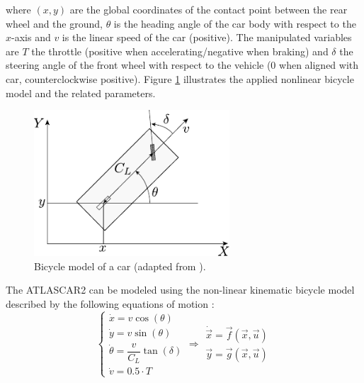 where $(x,y)$ are the global coordinates of the contact point between the rear wheel and the ground, $\theta$ is the heading angle of the car body with respect to the $x$-axis and $v$ is the linear speed of the car (positive). The manipulated variables are $T$ the throttle (positive when accelerating/negative when braking) and $\delta$ the steering angle of the front wheel with respect to the vehicle ($0$ when aligned with car, counterclockwise positive). Figure \ref{fig:car_model} illustrates the applied nonlinear bicycle model and the related parameters.
\begin{figure}[!h]
	\centering
	\includegraphics[width=0.65\textwidth]{./figure/car_model.pdf}
	\caption{Bicycle model of a car (adapted from \cite{siciliano}).}
	\label{fig:car_model}
\end{figure}

The ATLASCAR2 can be modeled using the non-linear kinematic bicycle model described by the following equations of motion \cite{safety} \cite{swarms}:
\begin{equation}
\label{eqn:dynamics_model_obstacle_avoidance}
\left \{ \begin{array}{llll}
\dot{x} = v\cos(\theta)\\
\dot{y} = v\sin(\theta)\\
\dot{\theta} =\dfrac{v}{C_L}\tan(\delta)\\
\dot{v} =0.5 \cdot T
\end{array} 
\right .
\Longrightarrow 
\begin{array}{llll}
\dot{\vec{x}} = \vec{f}(\vec{x},\vec{u})\\
\vec{y} = \vec{g}(\vec{x},\vec{u})
\end{array}
\end{equation}

